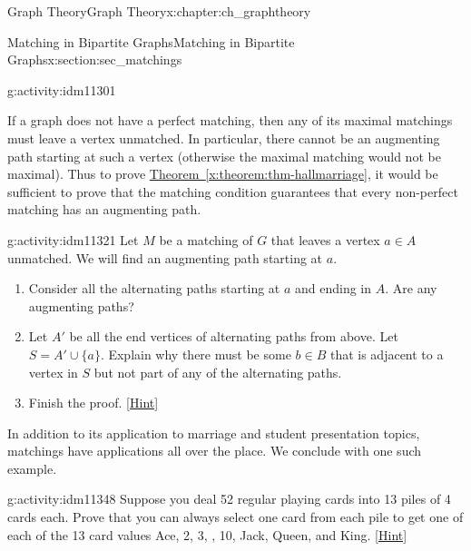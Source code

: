 \documentclass[oneside,10pt,]{book}
\numberwithin{equation}{chapter}
\newcommand{\vtx}[2]{node[fill,circle,inner sep=0pt, minimum size=4pt,label=#1:#2]{}}
\renewcommand{\v}{\vtx{above}{}}
\begin{document}
\begin{chapterptx}{Graph Theory}{}{Graph Theory}{}{}{x:chapter:ch_graphtheory}
\begin{sectionptx}{Matching in Bipartite Graphs}{}{Matching in Bipartite Graphs}{}{}{x:section:sec_matchings}
\begin{activity}{}{g:activity:idm11301}
\begin{enumerate}[font=\bfseries,label=(\alph*),ref=\alph*]
\begin{sidebyside}{1}{0.25}{0.25}{0}
\begin{sbspanel}{0.5}
{
}%
\end{sbspanel}%
\end{sidebyside}%
\end{enumerate}
\end{activity}
If a graph does not have a perfect matching, then any of its maximal matchings must leave a vertex unmatched.  In particular, there cannot be an augmenting path starting at such a vertex (otherwise the maximal matching would not be maximal).  Thus to prove \hyperref[x:theorem:thm-hallmarriage]{Theorem~\ref{x:theorem:thm-hallmarriage}}, it would be sufficient to prove that the matching condition guarantees that every non-perfect matching has an augmenting path.%
\begin{activity}{}{g:activity:idm11321}%
Let \(M\) be a matching of \(G\) that leaves a vertex \(a \in A\) unmatched.  We will find an augmenting path starting at \(a\).%
\begin{enumerate}[font=\bfseries,label=(\alph*),ref=\alph*]
\item{}Consider all the alternating paths starting at \(a\) and ending in \(A\).  Are any augmenting paths?%
\item{}Let \(A'\) be all the end vertices of alternating paths from above.  Let \(S = A' \cup \{a\}\).  Explain why there must be some \(b \in B\) that is adjacent to a vertex in \(S\) but not part of any of the alternating paths.%
\item{}Finish the proof.%
\space\hspace*{0pt}\hfill{\tiny\hyperlink{g:hint:idm11343-back}{[Hint]}}\end{enumerate}
\end{activity}
In addition to its application to marriage and student presentation topics, matchings have applications all over the place. We conclude with one such example.%
\begin{activity}{}{g:activity:idm11348}%
Suppose you deal 52 regular playing cards into 13 piles of 4 cards each. Prove that you can always select one card from each pile to get one of each of the 13 card values Ace, 2, 3, \textellipsis{}, 10, Jack, Queen, and King.%
\space\hspace*{0pt}\hfill{\tiny\hyperlink{g:hint:idm11352-back}{[Hint]}}\end{activity}

\end{sectionptx}
\end{chapterptx}
\end{document}
